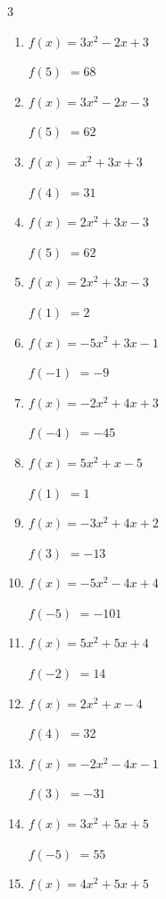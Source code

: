 \begin{multicols}{3}
\begin{enumerate}
$f(5)$
        $= -120$

\columnbreak %

\resetques

  \item $f(x)=3x^{2}-2x+3$

$f(5)$
        $= 68$

  \item $f(x)=3x^{2}-2x-3$

$f(5)$
        $= 62$

  \item $f(x)=x^{2}+3x+3$

$f(4)$
        $= 31$

  \item $f(x)=2x^{2}+3x-3$

$f(5)$
        $= 62$

  \item $f(x)=2x^{2}+3x-3$

$f(1)$
        $= 2$

  \item $f(x)=-5x^{2}+3x-1$

$f(-1)$
        $= -9$

  \item $f(x)=-2x^{2}+4x+3$

$f(-4)$
        $= -45$

  \item $f(x)=5x^{2}+x-5$

$f(1)$
        $= 1$

  \item $f(x)=-3x^{2}+4x+2$

$f(3)$
        $= -13$

  \item $f(x)=-5x^{2}-4x+4$

$f(-5)$
        $= -101$

  \item $f(x)=5x^{2}+5x+4$

$f(-2)$
        $= 14$

  \item $f(x)=2x^{2}+x-4$

$f(4)$
        $= 32$

  \item $f(x)=-2x^{2}-4x-1$

$f(3)$
        $= -31$

  \item $f(x)=3x^{2}+5x+5$

$f(-5)$
        $= 55$

  \item $f(x)=4x^{2}+5x+5$


\end{enumerate}
\end{multicols}
